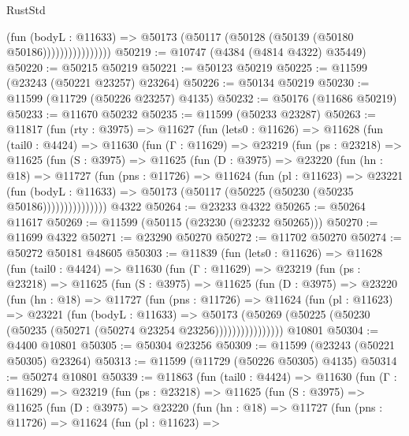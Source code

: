 \begin{lexlean}{RustStd}
\begin{coremodule}
                          (fun (bodyL : @11633) =>
                          @50173 (@50117 (@50128 (@50139 (@50180 @50186))))))))))))))))
@50219 := @10747 (@4384 (@4814 @4322) @35449)
@50220 := @50215 @50219
@50221 := @50123 @50219
@50225 := @11599 (@23243 (@50221 @23257) @23264)
@50226 := @50134 @50219
@50230 := @11599 (@11729 (@50226 @23257) @4135)
@50232 := @50176 (@11686 @50219)
@50233 := @11670 @50232
@50235 := @11599 (@50233 @23287)
@50263 := @11817
    (fun (rty : @3975) =>
    @11627
      (fun (lets0 : @11626) =>
      @11628
        (fun (tail0 : @4424) =>
        @11630
          (fun (Γ : @11629) =>
          @23219
            (fun (ps : @23218) =>
            @11625
              (fun (S : @3975) =>
              @11625
                (fun (D : @3975) =>
                @23220
                  (fun (hn : @18) =>
                  @11727
                    (fun (pns : @11726) =>
                    @11624
                      (fun (pl : @11623) =>
                      @23221
                        (fun (bodyL : @11633) =>
                        @50173 (@50117 (@50225 (@50230 (@50235 @50186)))))))))))))))
    @4322
@50264 := @23233 @4322
@50265 := @50264 @11617
@50269 := @11599 (@50115 (@23230 (@23232 @50265)))
@50270 := @11699 @4322
@50271 := @23290 @50270
@50272 := @11702 @50270
@50274 := @50272 @50181 @48605
@50303 := @11839
    (fun (lets0 : @11626) =>
    @11628
      (fun (tail0 : @4424) =>
      @11630
        (fun (Γ : @11629) =>
        @23219
          (fun (ps : @23218) =>
          @11625
            (fun (S : @3975) =>
            @11625
              (fun (D : @3975) =>
              @23220
                (fun (hn : @18) =>
                @11727
                  (fun (pns : @11726) =>
                  @11624
                    (fun (pl : @11623) =>
                    @23221
                      (fun (bodyL : @11633) =>
                      @50173
                        (@50269
                          (@50225 (@50230 (@50235 (@50271 (@50274 @23254 @23256))))))))))))))))
    @10801
@50304 := @4400 @10801
@50305 := @50304 @23256
@50309 := @11599 (@23243 (@50221 @50305) @23264)
@50313 := @11599 (@11729 (@50226 @50305) @4135)
@50314 := @50274 @10801
@50339 := @11863
    (fun (tail0 : @4424) =>
    @11630
      (fun (Γ : @11629) =>
      @23219
        (fun (ps : @23218) =>
        @11625
          (fun (S : @3975) =>
          @11625
            (fun (D : @3975) =>
            @23220
              (fun (hn : @18) =>
              @11727
                (fun (pns : @11726) =>
                @11624
                  (fun (pl : @11623) =>

\end{coremodule}
\end{lexlean}
